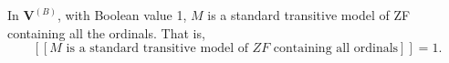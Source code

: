 In $\mathbf{V}^{(B)}$, with Boolean value 1, $M$ is a standard transitive model of ZF containing all the ordinals. That is,
$$[[M \text{ is a standard transitive model of } ZF \text{ containing all ordinals}]] = 1.$$
